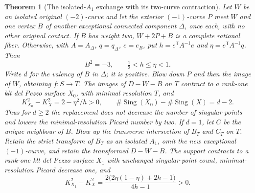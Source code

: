 \documentclass[11pt,reqno]{amsart}
\newtheorem{theorem}{Theorem}[section]
\theoremstyle{definition}
\theoremstyle{remark}
\DeclareMathOperator{\Sing}{Sing}
\numberwithin{equation}{section}
\begin{document}
\begin{theorem}[The isolated-$A_1$ exchange with its two-curve contraction]
\label{thm:isolated-node-exchange}
Let $W$ be an isolated original $(-2)$-curve and let the exterior $(-1)$-curve
$P$ meet $W$ and one vertex $B$ of another exceptional connected component
$\Delta$, once each, with no other original contact.
If $B$ has weight two, $W+2P+B$ is a complete rational fiber.
Otherwise, with $A=A_\Delta$, $q=q_\Delta$, $e=e_B$, put
$h=e^{\mathsf T}A^{-1}e$ and $\eta=e^{\mathsf T}A^{-1}q$.
Then
\begin{equation}\label{eq:isolated-mixed-range}
 B^2=-3,\qquad \tfrac12<h\le\eta<1.
\end{equation}
Write $d$ for the valency of $B$ in $\Delta$; it is positive.
Blow down $P$ and then the image of $W$, obtaining $f:S\to T$.
The images of $D-W-B$ on $T$ contract to a rank-one klt del Pezzo
surface $X_0$, with minimal resolution $T$, and
\begin{equation}\label{eq:isolated-mixed-nonterminal-gain}
 K_{X_0}^2-K_X^2=2-\eta^2/h>0,\qquad
 \#\Sing(X_0)-\#\Sing(X)=d-2.
\end{equation}
Thus for $d\ge2$ the replacement does not decrease the number of
singular points and lowers the minimal-resolution Picard number by two.
If $d=1$, let $C$ be the unique neighbour of $B$.
Blow up the transverse intersection of $B_T$ and $C_T$ on $T$.
Retain the strict transform of $B_T$ as an isolated $A_1$, omit the new
exceptional $(-1)$-curve, and retain the transformed $D-W-B$.
The support contracts to a rank-one klt del Pezzo surface $X_1$ with
unchanged singular-point count, minimal-resolution Picard decrease one,
and
\begin{equation}\label{eq:isolated-mixed-terminal-gain}
 K_{X_1}^2-K_X^2
 =\frac{2\bigl(2\eta(1-\eta)+2h-1\bigr)}{4h-1}>0.
\end{equation}
\end{theorem}
\end{document}
